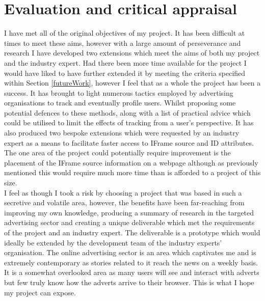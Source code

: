 \documentclass[12pt]{article}
\begin{document}
\section{Evaluation and critical appraisal}
I have met all of the original objectives of my project. It has been difficult at times to meet these aims, however with a large amount of perseverance and research I have developed two extensions which meet the aims of both my project and the industry expert. Had there been more time available for the project I would have liked to have further extended it by meeting the criteria specified within Section \ref{futureWork}, however I feel that as a whole the project has been a success. It has brought to light numerous tactics employed by advertising organisations to track and eventually profile users. Whilst proposing some potential defences to these methods, along with a list of practical advice which could be utilised to limit the effects of tracking from a user's perspective. It has also produced two bespoke extensions which were requested by an industry expert as a means to facilitate faster access to IFrame source and ID attributes. The one area of the project could potentially require improvement is the placement of the IFrame source information on a webpage although as previously mentioned this would require much more time than is afforded to a project of this size. \\

I feel as though I took a risk by choosing a project that was based in such a secretive and volatile area, however, the benefits have been far-reaching from improving my own knowledge, producing a summary of research in the targeted advertising sector and creating a unique deliverable which met the requirements of the project and an industry expert. The deliverable is a prototype which would ideally be extended by the development team of the industry experts' organisation. The online advertising sector is an area which captivates me and is extremely contemporary as stories related to it reach the news on a weekly basis. It is a somewhat overlooked area as many users will see and interact with adverts but few truly know how the adverts arrive to their browser. This is what I hope my project can expose. \\
\end{document}
